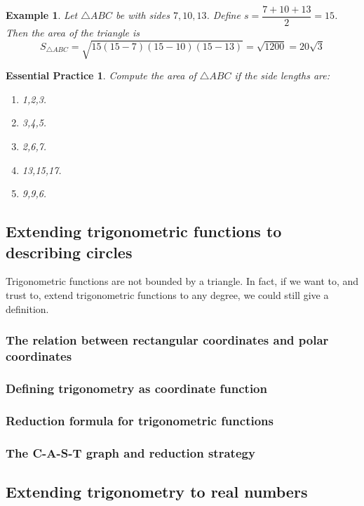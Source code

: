 \documentclass[12pt]{article}
\newtheorem*{example}{Example}
\newtheorem{exercise}{Essential Practice}[subsection]
\begin{document}
    \begin{example}
        Let $\triangle ABC$ be with sides $7,10,13$. Define $s=\dfrac{7+10+13}{2}=15$. Then the area of the triangle is $$S_{\triangle ABC}=\sqrt{15(15-7)(15-10)(15-13)}=\sqrt{1200}=20\sqrt{3}$$
    \end{example}

    \begin{exercise}
        Compute the area of $\triangle ABC$ if the side lengths are:\begin{enumerate}
            \item 1,2,3.
            \item 3,4,5.
            \item 2,6,7.
            \item 13,15,17.
            \item 9,9,6.
        \end{enumerate}
    \end{exercise}
    \subsection{Extending trigonometric functions to describing circles}

    Trigonometric functions are not bounded by a triangle. In fact, if we want to, and trust to, extend trigonometric functions to any degree, we could still give a definition.

    \subsubsection*{The relation between rectangular coordinates and polar coordinates}

    \subsubsection*{Defining trigonometry as coordinate function}

    \subsubsection*{Reduction formula for trigonometric functions}

    \subsubsection*{The C-A-S-T graph and reduction strategy}

    \subsection{Extending trigonometry to real numbers}
\end{document}
